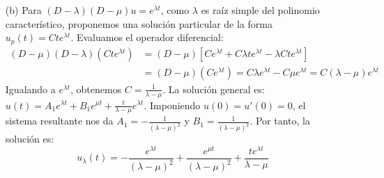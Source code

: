 {\begin{enumerate}
\[        \]
        Aplicando la regla de Cramer para despejar los coeficientes:
        \begin{align*}
            A &= \frac{\begin{vmatrix} -1/P(\omega) & 1 \\ -\omega/P(\omega) & \mu \end{vmatrix}}{\begin{vmatrix} 1 & 1 \\ \lambda & \mu \end{vmatrix}} = \frac{\frac{-\mu + \omega}{P(\omega)}}{\mu - \lambda} = \frac{\omega - \mu}{(\omega-\lambda)(\omega-\mu)(\mu-\lambda)} = \frac{1}{(\omega-\lambda)(\mu-\lambda)} \\
            B &= \frac{\begin{vmatrix} 1 & -1/P(\omega) \\ \lambda & -\omega/P(\omega) \end{vmatrix}}{\mu - \lambda} = \frac{\frac{-\omega + \lambda}{P(\omega)}}{\mu - \lambda} = \frac{-(\omega-\lambda)}{(\omega-\lambda)(\omega-\mu)(\mu-\lambda)} = \frac{1}{(\omega-\mu)(\lambda-\mu)}
        \end{align*}
        Sustituyendo $A$ y $B$, la solución única es:
        \[
            u_\omega(t) = \frac{e^{\lambda t}}{(\omega-\lambda)(\mu-\lambda)} + \frac{e^{\mu t}}{(\omega-\mu)(\lambda-\mu)} + \frac{e^{\omega t}}{(\omega-\lambda)(\omega-\mu)}
        \]

        \item[(b)] Para $(D-\lambda)(D-\mu)u = e^{\lambda t}$, como $\lambda$ es raíz simple del polinomio característico, proponemos una solución particular de la forma $u_p(t) = C t e^{\lambda t}$. 
        Evaluamos el operador diferencial:
        \begin{align*}
            (D-\mu)(D-\lambda)(C t e^{\lambda t}) &= (D-\mu) [C e^{\lambda t} + C \lambda t e^{\lambda t} - \lambda C t e^{\lambda t}] \\
            &= (D-\mu)(C e^{\lambda t}) = C \lambda e^{\lambda t} - C \mu e^{\lambda t} = C(\lambda-\mu)e^{\lambda t}
        \end{align*}
        Igualando a $e^{\lambda t}$, obtenemos $C = \frac{1}{\lambda-\mu}$.
        La solución general es: $u(t) = A_1 e^{\lambda t} + B_1 e^{\mu t} + \frac{t}{\lambda-\mu} e^{\lambda t}$.
        Imponiendo $u(0)=u'(0)=0$, el sistema resultante nos da $A_1 = -\frac{1}{(\lambda-\mu)^2}$ y $B_1 = \frac{1}{(\lambda-\mu)^2}$.
        Por tanto, la solución es:
        \[
            u_\lambda(t) = -\frac{e^{\lambda t}}{(\lambda-\mu)^2} + \frac{e^{\mu t}}{(\lambda-\mu)^2} + \frac{t e^{\lambda t}}{\lambda-\mu}
        \]


\end{enumerate}}
